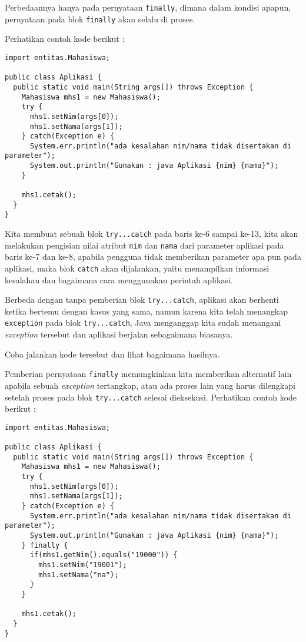 Perbedaannya hanya pada pernyataan \texttt{finally}, dimana dalam kondisi apapun, pernyataan pada blok \texttt{finally} akan selalu di proses. 

Perhatikan contoh kode berikut :

\begin{lstlisting}
import entitas.Mahasiswa;

public class Aplikasi {
  public static void main(String args[]) throws Exception {
    Mahasiswa mhs1 = new Mahasiswa();
    try {
      mhs1.setNim(args[0]);
      mhs1.setNama(args[1]);
    } catch(Exception e) {
      System.err.println("ada kesalahan nim/nama tidak disertakan di parameter");
      System.out.println("Gunakan : java Aplikasi {nim} {nama}");
    } 

    mhs1.cetak();
  }
}
\end{lstlisting}

Kita membuat sebuah blok \texttt{try...catch} pada baris ke-6 sampai ke-13, kita akan melakukan pengisian nilai atribut \texttt{nim} dan \texttt{nama} dari parameter aplikasi pada baris ke-7 dan ke-8, apabila pengguna tidak memberikan parameter apa pun pada aplikasi, maka blok \texttt{catch} akan dijalankan, yaitu menampilkan informasi kesalahan dan bagaimana cara menggunakan perintah aplikasi.

Berbeda dengan tanpa pemberian blok \texttt{try...catch}, aplikasi akan berhenti ketika bertemu dengan kasus yang sama, namun karena kita telah menangkap \texttt{exception} pada blok \texttt{try...catch}, Java menganggap kita sudah menangani \textit{exception} tersebut dan aplikasi berjalan sebagaimana biasanya.

Coba jalankan kode tersebut dan lihat bagaimana hasilnya.

Pemberian pernyataan \texttt{finally} memungkinkan kita memberikan alternatif lain apabila sebuah \textit{exception} tertangkap, atau ada proses lain yang harus dilengkapi setelah proses pada blok \texttt{try...catch} selesai dieksekusi. Perhatikan contoh kode berikut :

\begin{lstlisting}
import entitas.Mahasiswa;

public class Aplikasi {
  public static void main(String args[]) throws Exception {
    Mahasiswa mhs1 = new Mahasiswa();
    try {
      mhs1.setNim(args[0]);
      mhs1.setNama(args[1]);
    } catch(Exception e) {
      System.err.println("ada kesalahan nim/nama tidak disertakan di parameter");
      System.out.println("Gunakan : java Aplikasi {nim} {nama}");
    } finally {
      if(mhs1.getNim().equals("19000")) {
        mhs1.setNim("19001");
        mhs1.setNama("na");
      }
    }

    mhs1.cetak();
  }
}
\end{lstlisting}

